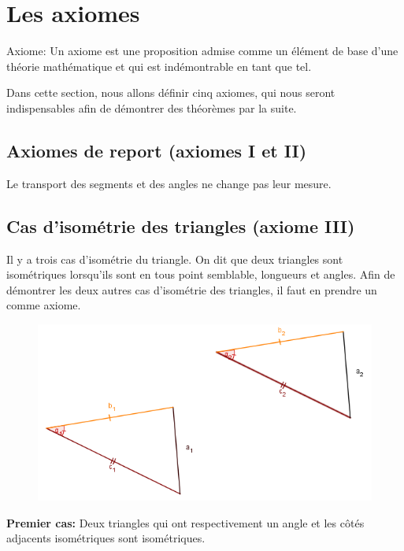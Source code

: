 \documentclass[a4paper,12pt]{article}
\begin{document}
\pagebreak
\section{Les axiomes}
\begin{definition}{Axiome:}
 Un axiome est une proposition admise comme un élément de base d'une théorie mathématique et qui est indémontrable en tant que tel.
\end{definition}

Dans cette section, nous allons définir cinq axiomes, qui nous seront indispensables afin de démontrer des théorèmes par la suite.

\subsection{Axiomes de report (axiomes I et II)}
Le transport des segments et des angles ne change pas leur mesure.

\subsection{Cas d'isométrie des triangles (axiome III)}
Il y a trois cas d'isométrie du triangle. On dit que deux triangles sont isométriques lorsqu'ils sont en tous point semblable, longueurs et angles. Afin de démontrer les deux autres cas d'isométrie des triangles, il faut en prendre un comme axiome.\\

\begin{figure}[H]
    \centering
    \includegraphics[scale=0.6]{Cas_1.PNG}
  \end{figure}  
\textbf{Premier cas:} Deux triangles qui ont respectivement un angle et les côtés adjacents isométriques sont isométriques.
\end{document}
